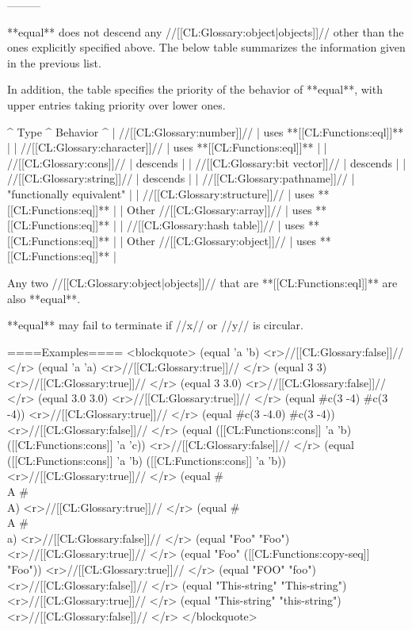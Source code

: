 ---------

**equal** does not descend any //[[CL:Glossary:object|objects]]// other than the ones explicitly specified above. The below table summarizes the information given in the previous list.

In addition, the table specifies the priority of the behavior of **equal**, with upper entries taking priority over lower ones.

^ Type                             ^ Behavior                      ^
| //[[CL:Glossary:number]]//       | uses **[[CL:Functions:eql]]** |
| //[[CL:Glossary:character]]//    | uses **[[CL:Functions:eql]]** |
| //[[CL:Glossary:cons]]//         | descends                      |
| //[[CL:Glossary:bit vector]]//   | descends                      |
| //[[CL:Glossary:string]]//       | descends                      |
| //[[CL:Glossary:pathname]]//     | "functionally equivalent"     |
| //[[CL:Glossary:structure]]//    | uses **[[CL:Functions:eq]]**  |
| Other //[[CL:Glossary:array]]//  | uses **[[CL:Functions:eq]]**  |
| //[[CL:Glossary:hash table]]//   | uses **[[CL:Functions:eq]]**  |
| Other //[[CL:Glossary:object]]// | uses **[[CL:Functions:eq]]**  |

Any two //[[CL:Glossary:object|objects]]// that are **[[CL:Functions:eql]]** are also **equal**.

**equal** may fail to terminate if //x// or //y// is circular.

====Examples====
<blockquote> 
(equal 'a 'b) <r>//[[CL:Glossary:false]]// </r>
(equal 'a 'a) <r>//[[CL:Glossary:true]]// </r>
(equal 3 3) <r>//[[CL:Glossary:true]]// </r>
(equal 3 3.0) <r>//[[CL:Glossary:false]]// </r>
(equal 3.0 3.0) <r>//[[CL:Glossary:true]]// </r>
(equal #c(3 -4) #c(3 -4)) <r>//[[CL:Glossary:true]]// </r>
(equal #c(3 -4.0) #c(3 -4)) <r>//[[CL:Glossary:false]]// </r>
(equal ([[CL:Functions:cons]] 'a 'b) ([[CL:Functions:cons]] 'a 'c)) <r>//[[CL:Glossary:false]]// </r>
(equal ([[CL:Functions:cons]] 'a 'b) ([[CL:Functions:cons]] 'a 'b)) <r>//[[CL:Glossary:true]]// </r>
(equal #\\A #\\A) <r>//[[CL:Glossary:true]]// </r>
(equal #\\A #\\a) <r>//[[CL:Glossary:false]]// </r>
(equal "Foo" "Foo") <r>//[[CL:Glossary:true]]// </r>
(equal "Foo" ([[CL:Functions:copy-seq]] "Foo")) <r>//[[CL:Glossary:true]]// </r>
(equal "FOO" "foo") <r>//[[CL:Glossary:false]]// </r>
(equal "This-string" "This-string") <r>//[[CL:Glossary:true]]// </r>
(equal "This-string" "this-string") <r>//[[CL:Glossary:false]]// </r>
</blockquote>

